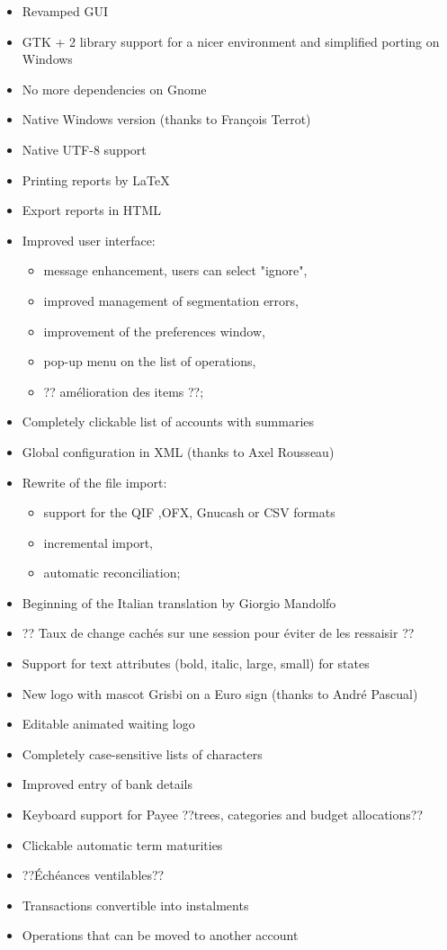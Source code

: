 \begin{itemize}
	\item Revamped GUI
	\item GTK + 2 library support for a nicer environment and simplified porting on Windows
	\item No more dependencies on Gnome
	\item Native Windows version (thanks to François Terrot)
	\item Native \gls{UTF-8} support 
	\item Printing reports by \gls{LaTeX}
	\item Export reports in \gls{HTML}
	\item Improved user interface:
\begin{itemize}%
	\item message enhancement, users can select "ignore",
	\item improved management of segmentation errors,
	\item improvement of the preferences window,
	\item pop-up menu on the list of operations,
	\item ?? amélioration des items ??;
\end{itemize}
	\item Completely clickable list of accounts with summaries
	\item Global configuration in \gls{XML} (thanks to Axel Rousseau)
	\item Rewrite of the file import:
\begin{itemize}%
	\item support for the \gls{QIF} ,\gls{OFX}, \gls{Gnucash} or \gls{CSV}  formats
	\item incremental import,
	\item automatic reconciliation;
\end{itemize}
	\item Beginning of the Italian translation by Giorgio Mandolfo
	\item ?? Taux de change cachés sur une session pour éviter de les ressaisir ??
	\item Support for text attributes (bold, italic, large, small) for states
	\item New logo with mascot Grisbi on a Euro sign (thanks to André Pascual)
	\item Editable animated waiting logo
	\item Completely case-sensitive lists of characters
	\item Improved entry of bank details
	\item Keyboard support for Payee ??trees, categories and budget allocations??
	\item Clickable automatic term maturities
	\item ??Échéances ventilables??
	\item Transactions convertible into instalments
	\item Operations that can be moved to another account
\end{itemize}

